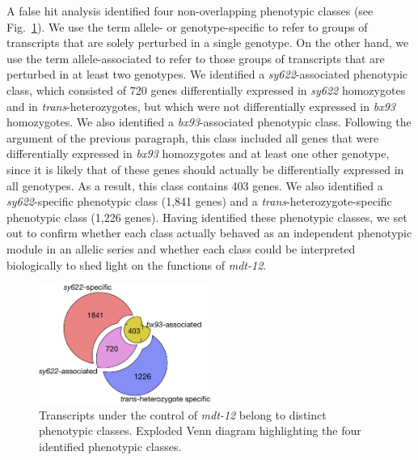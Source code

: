 \documentclass[10pt, twocolumn]{article}
\newcommand{\gene}[1]{\mbox{\emph{#1}}}
\newcommand{\dpy}{\gene{mdt-12}}
\begin{document}
A false hit analysis identified four non-overlapping phenotypic classes (see
Fig.~\ref{fig:venn}). We use the term allele- or genotype-specific to refer to
groups of transcripts that are solely perturbed in a single genotype. On the
other hand, we use the term allele-associated to refer to those groups of
transcripts that are perturbed in at least two genotypes. We identified a
\emph{sy622}-associated phenotypic class, which consisted of 720 genes
differentially expressed in \emph{sy622} homozygotes and in
\emph{trans}-heterozygotes, but which were not differentially expressed in
\emph{bx93} homozygotes. We also identified a \emph{bx93}-associated phenotypic
class. Following the argument of the previous paragraph, this class included all
genes that were differentially expressed in \emph{bx93} homozygotes and at least
one other genotype, since it is likely that of these genes should actually be
differentially expressed in all genotypes. As a result, this class contains 403
genes. We also identified a \emph{sy622}-specific phenotypic class (1,841 genes)
and a \emph{trans}-heterozygote-specific phenotypic class (1,226 genes). Having
identified these phenotypic classes, we set out to confirm whether each class
actually behaved as an independent phenotypic module in an allelic series and
whether each class could be interpreted biologically to shed light on the
functions of \dpy{}.


\begin{figure}
  \includegraphics[width=0.5\textwidth]{../figs/exploded_venn.pdf}
  \caption{
  Transcripts under the control of \dpy{} belong to distinct phenotypic
  classes. Exploded Venn diagram highlighting the four identified phenotypic
  classes.
  }
\label{fig:venn}
\end{figure}
\end{document}
